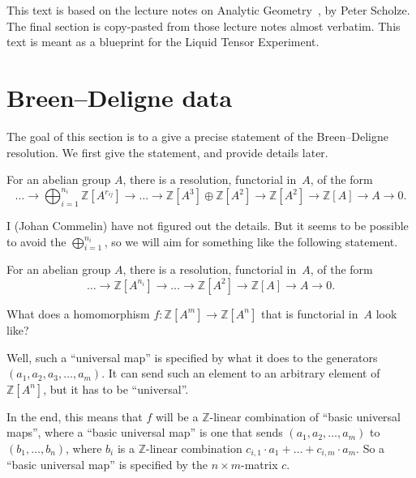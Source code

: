 \maketitle

\begin{remark}
	This text is based on the lecture notes on Analytic Geometry~\cite{Analytic},
	by Peter Scholze.
  The final section is copy-pasted from those lecture notes almost verbatim.
  This text is meant as a blueprint for the Liquid Tensor Experiment.
\end{remark}

\section{Breen--Deligne data}

The goal of this section is to a give a precise statement of the Breen--Deligne resolution.
We first give the statement, and provide details later.

\begin{theoremx}
  \label{BD_orig}
  For an abelian group $A$, there is a resolution, functorial in~$A$, of the form
  \[
    \ldots \to \bigoplus_{i=1}^{n_i} \mathbb Z[A^{r_{ij}}] \to \ldots
    \to \mathbb Z[A^3] \oplus \mathbb Z[A^2] \to \mathbb Z[A^2] \to \mathbb Z[A] \to A \to 0.
  \]
\end{theoremx}

I (Johan Commelin) have not figured out the details.
But it seems to be possible to avoid the $\bigoplus_{i=1}^{n_i}$,
so we will aim for something like the following statement.

\begin{theoremx}
  \label{BD_reso}
  For an abelian group $A$, there is a resolution, functorial in~$A$, of the form
  \[
    \ldots \to \mathbb Z[A^{n_{i}}] \to \ldots \to \mathbb Z[A^2] \to \mathbb Z[A] \to A \to 0.
  \]
\end{theoremx}

What does a homomorphism $f \colon \mathbb Z[A^m] \to \mathbb Z[A^n]$
that is functorial in~$A$ look like?

Well, such a ``universal map'' is specified
by what it does to the generators $(a_1, a_2, a_3, \dots, a_m)$.
It can send such an element to an arbitrary element of $\mathbb Z[A^n]$,
but it has to be ``universal''.

In the end, this means that $f$ will be a $\mathbb Z$-linear combination of
``basic universal maps'', where a ``basic universal map'' is one that
sends $(a_1, a_2, \dots, a_m)$ to $(b_1, \dots, b_n)$,
where $b_i$ is a $\mathbb Z$-linear combination $c_{i,1} \cdot a_1 + \dots + c_{i,m} \cdot a_m$.
So a ``basic universal map'' is specified by the $n \times m$-matrix $c$.

